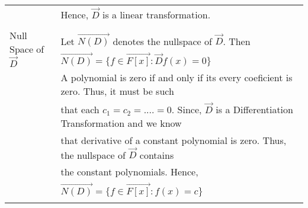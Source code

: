 \begin{table*}[!ht]
\begin{tabular}{|l|l|}
		& Hence, $\vec{D}$ is a linear transformation.\\
		& \\
		\hline
		\multirow{3}{*}{Null Space of $\vec{D}$} & \\
		& Let $\vec{N(D)}$ denotes the nullspace of $\vec{D}$. Then\\
		& \qquad \qquad \qquad \qquad \qquad $\vec{N(D)} = \{f \in\vec{F[x]} : \vec{D}f(x) = 0 \}$\\
		& A polynomial is zero if and only if its every coeficient is zero. Thus, it must be such  \\
		& that each $c_1 = c_2 = ....=0$. Since, $\vec{D}$ is a Differentiation Transformation and we know \\
		& that derivative of a constant polynomial is zero. Thus, the nullspace of $\vec{D}$ contains \\
		& the constant polynomials. Hence,\\
		& \qquad \qquad \qquad \qquad \qquad $\vec{N(D)} =\{f \in \vec{F[x]} : f(x) = c \}$ \\
		& \\
		\hline
	\end{tabular}
\caption{}
\label{eq:solutions/4/1/9/b/table:2}
\end{table*}

